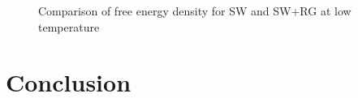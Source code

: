\documentclass[letterpaper,twocolumn,amsmath,amssymb,prb]{revtex4-1}
\begin{document}
\begin{figure}
  \begin{center}
  \end{center}
  \caption{Comparison of free energy density for SW and SW+RG at low temperature}
  \label{fig:SW-RG-compare-loT}
\end{figure}




\section{Conclusion}


\end{document}
